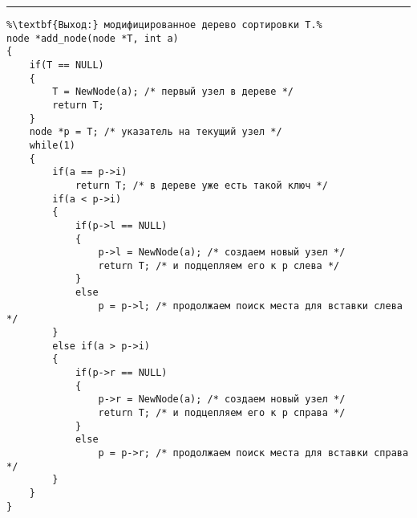 \vspace{5pt} \hrule
\begin{lstlisting}[caption={Вставка узла в дерево сортировки}, label=p317, escapechar=\%]
%\noindent\textbf{Вход:} дерево сортировки T, заданное указателем на корень; ключ a: key.\\%
%\textbf{Выход:} модифицированное дерево сортировки T.%
node *add_node(node *T, int a)
{
	if(T == NULL)
	{
		T = NewNode(a); /* первый узел в дереве */
		return T;
	}
	node *p = T; /* указатель на текущий узел */
	while(1)
	{
		if(a == p->i)
			return T; /* в дереве уже есть такой ключ */
		if(a < p->i)
		{
			if(p->l == NULL)
			{
				p->l = NewNode(a); /* создаем новый узел */
				return T; /* и подцепляем его к p слева */
			}
			else
				p = p->l; /* продолжаем поиск места для вставки слева */
		}
		else if(a > p->i)
		{
			if(p->r == NULL)
			{
				p->r = NewNode(a); /* создаем новый узел */
				return T; /* и подцепляем его к p справа */
			}
			else
				p = p->r; /* продолжаем поиск места для вставки справа */
		}
	}
}
\end{lstlisting}
